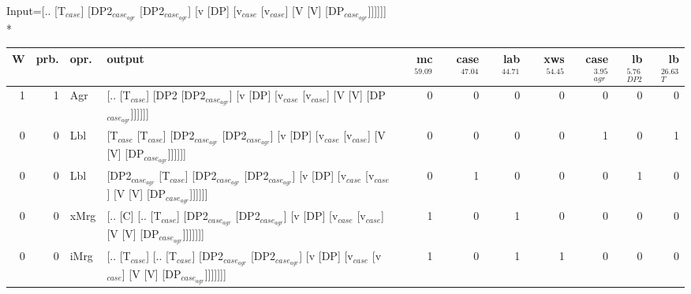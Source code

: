 \begingroup\scriptsize Input=[.. [T$_{case}$] [DP2$_{case_{agr}}$ [DP2$_{case_{agr}}$] [v [DP] [v$_{case}$ [v$_{case}$] [V [V] [DP$_{case_{agr}}$]]]]]]\\*
\begin{tabularx}{\linewidth}{rrlXrrrrrrr}
\hline
   W &   prb. & opr.   & output                                                                                                                                                                           &   mc$^{59.09}$ &   case$^{47.04}$ &   lab$^{44.71}$ &   xws$^{54.45}$ &   case$_{agr}^{3.95}$ &   lb$_{DP2}^{5.76}$ &   lb$_{T}^{26.63}$ \\
\hline
   1 &   1 & Agr  & [.. [T$_{case}$] [DP2 [DP2$_{case_{agr}}$] [v [DP] [v$_{case}$ [v$_{case}$] [V [V] [DP$_{case_{agr}}$]]]]]]                                                                                              &            0 &              0 &             0 &             0 &                  0 &            0 &              0 \\
   0 &   0 & Lbl  & [T$_{case}$ [T$_{case}$] [DP2$_{case_{agr}}$ [DP2$_{case_{agr}}$] [v [DP] [v$_{case}$ [v$_{case}$] [V [V] [DP$_{case_{agr}}$]]]]]]                                                                                 &            0 &              0 &             0 &             0 &                  1 &            0 &              1 \\
   0 &   0 & Lbl  & [DP2$_{case_{agr}}$ [T$_{case}$] [DP2$_{case_{agr}}$ [DP2$_{case_{agr}}$] [v [DP] [v$_{case}$ [v$_{case}$] [V [V] [DP$_{case_{agr}}$]]]]]]                                                                           &            0 &              1 &             0 &             0 &                  0 &            1 &              0 \\
   0 &   0 & xMrg & [.. [C] [.. [T$_{case}$] [DP2$_{case_{agr}}$ [DP2$_{case_{agr}}$] [v [DP] [v$_{case}$ [v$_{case}$] [V [V] [DP$_{case_{agr}}$]]]]]]]                                                                            &            1 &              0 &             1 &             0 &                  0 &            0 &              0 \\
   0 &   0 & iMrg & [.. [T$_{case}$] [.. [T$_{case}$] [DP2$_{case_{agr}}$ [DP2$_{case_{agr}}$] [v [DP] [v$_{case}$ [v$_{case}$] [V [V] [DP$_{case_{agr}}$]]]]]]]                                                                       &            1 &              0 &             1 &             1 &                  0 &            0 &              0 \\

\end{tabularx}
